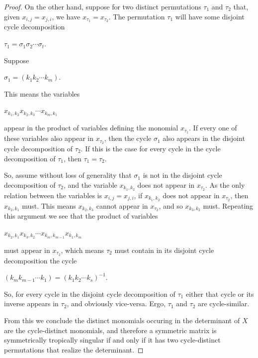 \documentclass{article}
\begin{document}
\begin{proof}
  On the other hand, suppose for two distinct permutations $\tau_{1}$ and $\tau_{2}$ that, given $x_{i,j} = x_{j,i}$, we have $x_{\tau_{1}} = x_{\tau_{2}}$. The permutation $\tau_{1}$ will have some disjoint cycle decomposition
  \begin{center}
    $\tau_{1} = \sigma_{1}\sigma_{2} \cdots \sigma_{t}$.
  \end{center}
  Suppose
  \begin{center}
    $\sigma_{1} = (k_{1}k_{2} \cdots k_{m})$.
  \end{center}
  This means the variables
  \begin{center}
    $x_{k_{1},k_{2}}x_{k_{2},k_{3}} \cdots x_{k_{m},k_{1}}$
  \end{center}
  appear in the product of variables defining the monomial $x_{\tau_{1}}$. If every one of these variables also appear in $x_{\tau_{2}}$, then the cycle $\sigma_{1}$ also appears in the disjoint cycle decomposition of $\tau_{2}$. If this is the case for every cycle in the cycle decomposition of $\tau_{1}$, then $\tau_{1} = \tau_{2}$. 
  
  So, assume without loss of generality that $\sigma_{1}$ is not in the disjoint cycle decomposition of $\tau_{2}$, and the variable $x_{k_{1},k_{2}}$ does not appear in $x_{\tau_{2}}$. As the only relation between the variables is $x_{i,j} = x_{j,i}$, if $x_{k_{1},k_{2}}$ does not appear in $x_{\tau_{2}}$, then $x_{k_{2},k_{1}}$ must. This means $x_{k_{2},k_{3}}$ cannot appear in $x_{\tau_{2}}$, and so $x_{k_{3},k_{2}}$ must. Repeating this argument we see that the product of variables
  \begin{center}
    $x_{k_{2},k_{1}}x_{k_{3},k_{2}} \cdots x_{k_{m},k_{m-1}}x_{k_{1},k_{m}}$
  \end{center}
  must appear in $x_{\tau_{2}}$, which means $\tau_{2}$ must contain in its disjoint cycle decomposition the cycle
  \begin{center}
    $(k_{m}k_{m-1} \cdots k_{1}) = (k_{1}k_{2} \cdots k_{s})^{-1}$.
  \end{center}
  So, for every cycle in the disjoint cycle decomposition of $\tau_{1}$ either that cycle or its inverse appears in $\tau_{2}$, and obviously vice-versa. Ergo, $\tau_{1}$ and $\tau_{2}$ are cycle-similar. 
  
  From this we conclude the distinct monomials occuring in the determinant of $X$ are the cycle-distinct monomials, and therefore a symmetric matrix is symmetrically tropically singular if and only if it has two cycle-distinct permutations that realize the determinant.
\end{proof}
\end{document}

